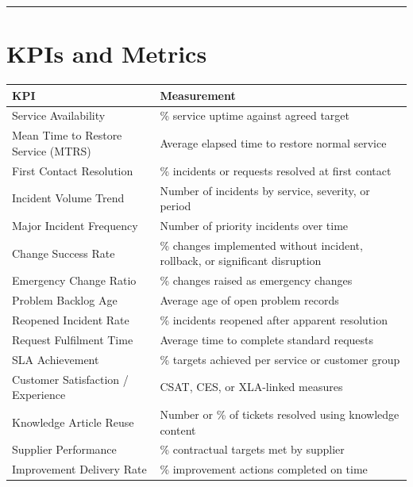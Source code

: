 \documentclass[
  letterpaper,
  DIV=11,
  numbers=noendperiod]{scrartcl}
\begin{document}
\begin{center}\rule{0.5\linewidth}{0.5pt}\end{center}

\section{KPIs and Metrics}\label{kpis-and-metrics}

\begin{longtable}[]{@{}
  >{\raggedright\arraybackslash}p{}
  >{\raggedright\arraybackslash}p{}@{}}
\toprule\noalign{}
\begin{minipage}[b]{\linewidth}\raggedright
KPI
\end{minipage} & \begin{minipage}[b]{\linewidth}\raggedright
Measurement
\end{minipage} \\
\midrule\noalign{}
\endhead
\bottomrule\noalign{}
\endlastfoot
Service Availability & \% service uptime against agreed target \\
Mean Time to Restore Service (MTRS) & Average elapsed time to restore
normal service \\
First Contact Resolution & \% incidents or requests resolved at first
contact \\
Incident Volume Trend & Number of incidents by service, severity, or
period \\
Major Incident Frequency & Number of priority incidents over time \\
Change Success Rate & \% changes implemented without incident, rollback,
or significant disruption \\
Emergency Change Ratio & \% changes raised as emergency changes \\
Problem Backlog Age & Average age of open problem records \\
Reopened Incident Rate & \% incidents reopened after apparent
resolution \\
Request Fulfilment Time & Average time to complete standard requests \\
SLA Achievement & \% targets achieved per service or customer group \\
Customer Satisfaction / Experience & CSAT, CES, or XLA-linked
measures \\
Knowledge Article Reuse & Number or \% of tickets resolved using
knowledge content \\
Supplier Performance & \% contractual targets met by supplier \\
Improvement Delivery Rate & \% improvement actions completed on time \\
\end{longtable}
\end{document}

